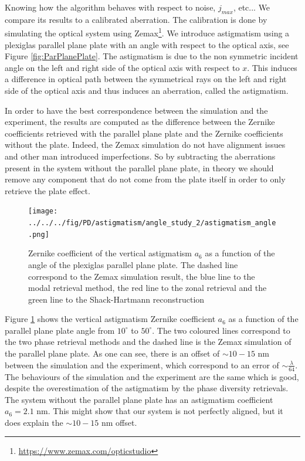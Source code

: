 Knowing how the algorithm behaves with respect to noise, $j_{max}$, etc... We compare its results to a calibrated aberration. The calibration is done by simulating the optical system using Zemax\footnote{\url{https://www.zemax.com/opticstudio}}. We introduce astigmatism using a plexiglas parallel plane plate with an angle with respect to the optical axis, see Figure \ref{fig:ParPlanePlate}. The astigmatism is due to the non symmetric incident angle on the left and right side of the optical axis with respect to $x$. This induces a difference in optical path between the symmetrical rays on the left and right side of the optical axis and thus induces an aberration, called the astigmatism.

In order to have the best correspondence between the simulation and the experiment, the results are computed as the difference between the Zernike coefficients retrieved with the parallel plane plate and the Zernike coefficients without the plate. Indeed, the Zemax simulation do not have alignment issues and other man introduced imperfections. So by subtracting the aberrations present in the system without the parallel plane plate, in theory we should remove any component that do not come from the plate itself in order to only retrieve the plate effect.

\begin{figure}
\begin{center}
\texttt{[image: ../../../fig/PD/astigmatism/angle\_study\_2/astigmatism\_angle.png]}
\decoRule
\caption{Zernike coefficient of the vertical astigmatism $a_6$ as a function of the angle of the plexiglas parallel plane plate. The dashed line correspond to the Zemax simulation result, the blue line to the modal retrieval method, the red line to the zonal retrieval and the green line to the Shack-Hartmann reconstruction}
\label{fig:astigmatism_angle_Diversity}
\end{center}
\end{figure}

Figure \ref{fig:astigmatism_angle_Diversity} shows the vertical astigmatism Zernike coefficient $a_6$ as a function of the parallel plane plate angle from $10^{\circ}$ to $50^{\circ}$. The two coloured lines correspond to the two phase retrieval methods and the dashed line is the Zemax simulation of the parallel plane plate. As one can see, there is an offset of $\sim 10-15$ nm between the simulation and the experiment, which correspond to an error of $\sim\frac{\lambda}{64}$. The behaviours of the simulation and the experiment are the same which is good, despite the overestimation of the astigmatism by the phase diversity retrievals. The system without the parallel plane plate has an astigmatism coefficient $ a_6 = 2.1$ nm. This might show that our system is not perfectly aligned, but it does explain the $\sim 10-15$ nm offset.

